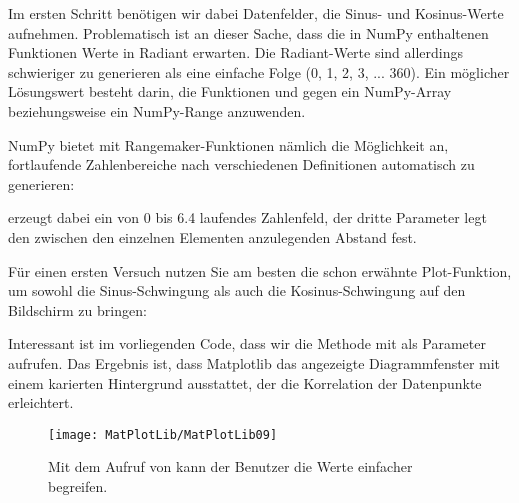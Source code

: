 Im ersten Schritt benötigen wir dabei Datenfelder, die Sinus- und Kosinus-Werte aufnehmen. Problematisch ist an dieser Sache, dass die in NumPy enthaltenen Funktionen Werte in Radiant erwarten. Die Radiant-Werte sind allerdings schwieriger zu generieren als eine einfache Folge (0, 1, 2, 3, ... 360). Ein möglicher Lösungswert besteht darin, die Funktionen  und  gegen ein NumPy-Array beziehungsweise ein NumPy-Range anzuwenden.

NumPy bietet mit Rangemaker-Funktionen nämlich die Möglichkeit an, fortlaufende Zahlenbereiche nach verschiedenen Definitionen automatisch zu generieren:

\medskip




\medskip

 erzeugt dabei ein von 0 bis 6.4 laufendes Zahlenfeld, der dritte Parameter legt den zwischen den einzelnen Elementen anzulegenden Abstand fest.

Für einen ersten Versuch nutzen Sie am besten die schon erwähnte Plot-Funktion, um sowohl die Sinus-Schwingung als auch die Kosinus-Schwingung auf den Bildschirm zu bringen:

\medskip





\medskip

Interessant ist im vorliegenden Code, dass wir die Methode  mit  als Parameter aufrufen. Das Ergebnis ist, dass Matplotlib das angezeigte Diagrammfenster mit einem karierten Hintergrund ausstattet, der die Korrelation der Datenpunkte erleichtert.

\begin{figure}
  \begin{center}  
    \texttt{[image: MatPlotLib/MatPlotLib09]}      
        
    \caption{Mit dem Aufruf von  kann der Benutzer die Werte einfacher begreifen.}\label{Matplotlib09}
  \end{center}    
\end{figure}

